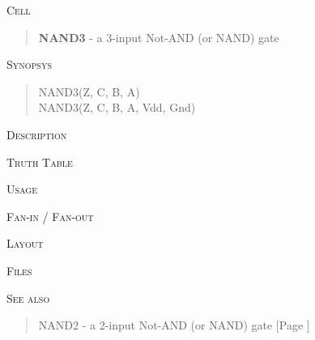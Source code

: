 
\label{NAND3}
\textsc{Cell}
\begin{quote}
    \textbf{NAND3} - a 3-input Not-AND (or NAND) gate
\end{quote}

\textsc{Synopsys}
\begin{quote}
    NAND3(Z, C, B, A) \\
    NAND3(Z, C, B, A, Vdd, Gnd)
\end{quote}

\textsc{Description}



\textsc{Truth Table}


\textsc{Usage}

\textsc{Fan-in / Fan-out}

\textsc{Layout}

\textsc{Files}

\textsc{See also}
\begin{quote}
    NAND2 - a 2-input Not-AND (or NAND) gate [Page \pageref{NAND2}]
\end{quote}
